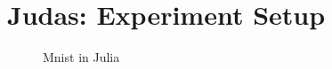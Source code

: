 \chapter{Judas: Experiment Setup}
\label{app:judas}

\begin{figure}[h]
    \centering
    
    \caption{Mnist in Julia}
    \label{fig:juliamnist}
\end{figure}